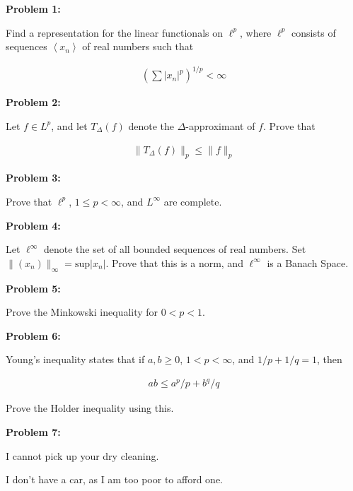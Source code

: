 \documentclass[a4paper,12pt]{article}
\newcommand{\shunt}{\vspace{20mm}}
\newcommand{\absval}[1]{\left\lvert #1 \right\rvert}
\newcommand{\norm}[1]{\|#1\|}
\newcommand{\anbrack}[1]{\left\langle #1 \right\rangle}
\newcommand{\De}{\Delta}
\begin{document}
{\bf Problem 1:} 

Find a representation for the linear functionals on $\ell^p$, where $\ell^p$ consists of sequences $\anbrack{x_n}$ of real numbers such that

\begin{align*}
(\sum\absval{x_n}^p)^{1/p}<\infty
\end{align*}

\shunt

{\bf Problem 2:} 

Let $f \in L^p$, and let $T_\De(f)$ denote the $\De$-approximant of $f$. Prove that

\begin{align*}
\norm{T_\De(f)}_p \leq \norm{f}_p
\end{align*}

\shunt

{\bf Problem 3:} 

Prove that $\ell^p$, $1\leq p < \infty$, and $L^\infty$ are complete.

\shunt

{\bf Problem 4:} 

Let $\ell^\infty$ denote the set of all bounded sequences of real numbers. Set $\norm{(x_n)}_\infty = \text{sup}\absval{x_n}$. Prove that this is a norm, and $\ell^\infty$ is a Banach Space.

\shunt

{\bf Problem 5:} 

Prove the Minkowski inequality for $0 < p < 1$.

\shunt

{\bf Problem 6:} 

Young's inequality states that if $a,b \geq 0$, $1 < p < \infty$, and $1/p + 1/q =1$, then

\begin{align*}
ab \leq a^p/p + b^q/q
\end{align*}

Prove the Holder inequality using this.

\shunt

{\bf Problem 7:}

I cannot pick up your dry cleaning.

I don't have a car, as I am too poor to afford one.

\shunt
\end{document}
